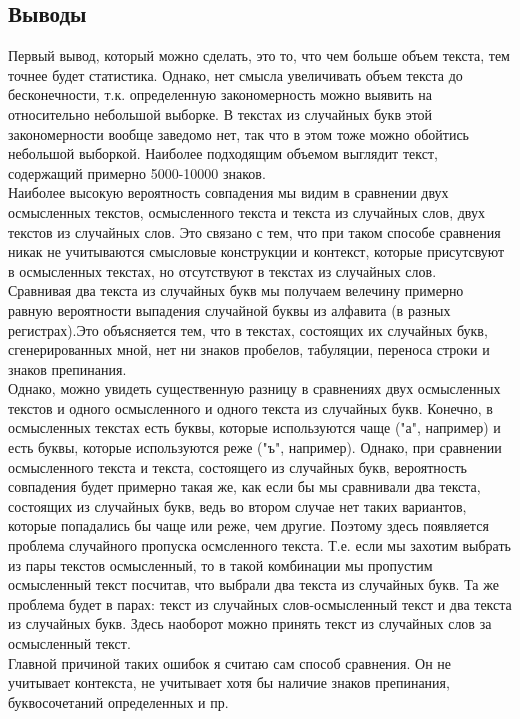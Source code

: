 \documentclass[12pt]{article}
\begin{document}
\subsection*{Выводы}
Первый вывод, который можно сделать, это то, что чем больше объем текста, тем точнее будет статистика. Однако, нет смысла увеличивать объем текста до бесконечности, т.к. определенную закономерность можно выявить на относительно небольшой выборке. В текстах из случайных букв этой закономерности вообще заведомо нет, так что в этом тоже можно обойтись небольшой выборкой. Наиболее подходящим объемом выглядит текст, содержащий примерно 5000-10000 знаков.\\
Наиболее высокую вероятность совпадения мы видим в сравнении двух осмысленных текстов, осмысленного текста и текста из случайных слов, двух текстов из случайных слов. Это связано с тем, что при таком способе сравнения никак не учитываются смысловые конструкции и контекст, которые присутсвуют в осмысленных текстах, но отсутствуют в текстах из случайных слов.\\
Сравнивая два текста из случайных букв мы получаем велечину примерно равную вероятности выпадения случайной буквы из алфавита (в разных регистрах).Это объясняется тем, что в текстах, состоящих их случайных букв, сгенерированных мной, нет ни знаков пробелов, табуляции, переноса строки и знаков препинания. \\
Однако, можно увидеть существенную разницу в сравнениях двух осмысленных текстов и одного осмысленного и одного текста из случайных букв. Конечно, в осмысленных текстах есть буквы, которые используются чаще ("а", например) и есть буквы, которые используются реже ("ъ", например). Однако, при сравнении осмысленного текста и текста, состоящего из случайных букв, вероятность совпадения будет примерно такая же, как если бы мы сравнивали два текста, состоящих из случайных букв, ведь во втором случае нет таких вариантов, которые попадались бы чаще или реже, чем другие. Поэтому здесь появляется проблема случайного пропуска осмсленного текста. Т.е. если мы захотим выбрать из пары текстов осмысленный, то в такой комбинации мы пропустим осмысленный текст посчитав, что выбрали два текста из случайных букв. Та же проблема будет в парах: текст из случайных слов-осмысленный текст и два текста из случайных букв. Здесь наоборот можно принять текст из случайных слов за осмысленный текст.\\
Главной причиной таких ошибок я считаю сам способ сравнения. Он не учитывает контекста, не учитывает хотя бы наличие знаков препинания, буквосочетаний определенных и пр. 
\end{document}
